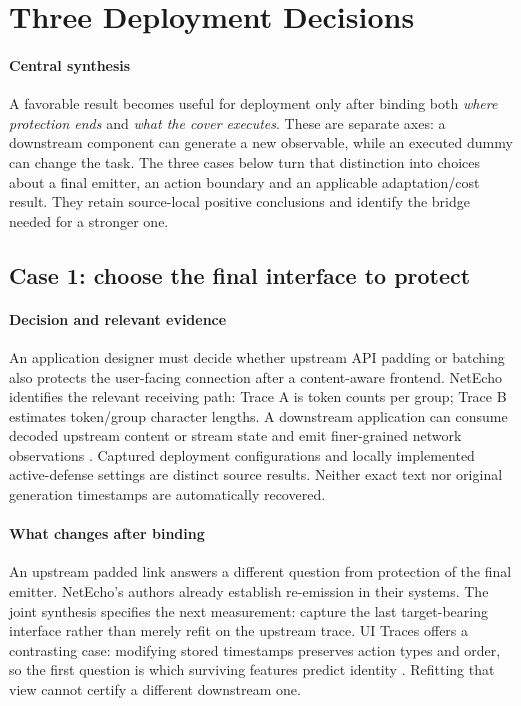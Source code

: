 \section{Three Deployment Decisions}\label{sec:discussion}
\paragraph{Central synthesis}
A favorable result becomes useful for deployment only after binding both \emph{where protection ends} and \emph{what the cover executes}. These are separate axes: a downstream component can generate a new observable, while an executed dummy can change the task. The three cases below turn that distinction into choices about a final emitter, an action boundary and an applicable adaptation/cost result. They retain source-local positive conclusions and identify the bridge needed for a stronger one.

\subsection{Case 1: choose the final interface to protect}
\paragraph{Decision and relevant evidence}
An application designer must decide whether upstream API padding or batching also protects the user-facing connection after a content-aware frontend. NetEcho identifies the relevant receiving path: Trace A is token counts per group; Trace B estimates token/group character lengths. A downstream application can consume decoded upstream content or stream state and emit finer-grained network observations \cite{netecho2025}. Captured deployment configurations and locally implemented active-defense settings are distinct source results. Neither exact text nor original generation timestamps are automatically recovered.

\paragraph{What changes after binding}
An upstream padded link answers a different question from protection of the final emitter. NetEcho's authors already establish re-emission in their systems. The joint synthesis specifies the next measurement: capture the last target-bearing interface rather than merely refit on the upstream trace. UI Traces offers a contrasting case: modifying stored timestamps preserves action types and order, so the first question is which surviving features predict identity \cite{uitraces2026}. Refitting that view cannot certify a different downstream one.


